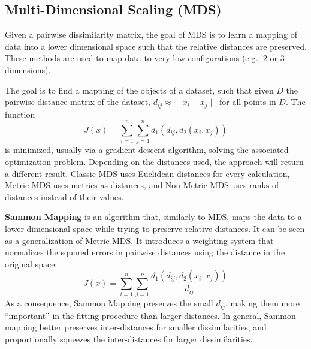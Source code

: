 \subsection{Multi-Dimensional Scaling (MDS)}

Given a pairwise dissimilarity matrix, the goal of MDS is to learn a mapping of data into a lower dimensional space such that the relative distances are preserved. These methods are used to map data to very low configurations (e.g., 2 or 3 dimensions).

The goal is to find a mapping of the objects of a dataset, such that given $D$ the pairwise distance matrix of the dataset, $d_{ij} \approx \|x_i - x_j\|$ for all points in $D$. The function
    \begin{equation*}
        J(x) = \sum_{i=1}^n \sum_{j=1}^n d_1 (d_{ij}, d_2(x_i, x_j))
    \end{equation*}
is minimized, usually via a gradient descent algorithm, solving the associated optimization problem. Depending on the distances used, the approach will return a different result. Classic MDS uses Euclidean distances for every calculation, Metric-MDS uses metrics as distances, and Non-Metric-MDS uses ranks of distances instead of their values.

\textbf{Sammon Mapping} is an algorithm that, similarly to MDS, maps the data to a lower dimensional space while trying to preserve relative distances. It can be seen as a generalization of Metric-MDS. It introduces a weighting system that normalizes the squared errors in pairwise distances using the distance in the original space:
\begin{equation*}
    J(x) = \sum_{i=1}^n \sum_{j=1}^n \dfrac{d_1 (d_{ij}, d_2(x_i, x_j))}{d_{ij}}
\end{equation*}
As a consequence, Sammon Mapping preserves the small $d_{ij}$, making them more ``important'' in the fitting procedure than larger distances. In general, Sammon mapping better preserves inter-distances for smaller dissimilarities, and proportionally squeezes the inter-distances for larger dissimilarities.

